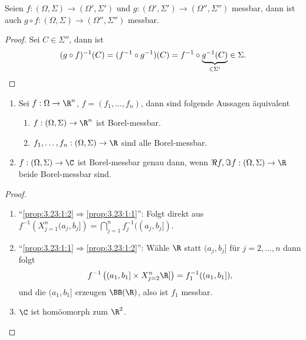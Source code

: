 \begin{prop}
\label{prop:3.22}
Seien $f: (\Omega,\Sigma)\to(\Omega',\Sigma')$ und $g: (\Omega',\Sigma')\to
(\Omega'',\Sigma'')$ messbar, dann ist auch $g\circ f:
(\Omega,\Sigma)\to(\Omega'',\Sigma'')$ messbar.\fishhere
\end{prop}
\begin{proof}
Sei $C\in\Sigma''$, dann ist
\begin{align*}
(g\circ f)^{-1}(C) = (f^{-1}\circ g^{-1})(C) = f^{-1}\circ
\underbrace{g^{-1}(C)}_{\in\Sigma'}\in\Sigma.\qedhere
\end{align*}
\end{proof}

\begin{prop}
\label{prop:3.23}
\begin{enumerate}[label=\arabic{*}.)]
  \item Sei $f:\Omega\to\R^n$, $f=(f_1,\ldots,f_n)$, dann
  sind folgende Aussagen äquivalent \begin{enumerate}[label=(\roman{*})]
    \item\label{prop:3.23:1:1} $f:(\Omega,\Sigma)\to\R^n$ ist Borel-messbar.
    \item\label{prop:3.23:1:2} $f_1,\ldots,f_n: (\Omega,\Sigma)\to\R$ sind alle
    Borel-messbar.
\end{enumerate}
\item $f:(\Omega,\Sigma)\to\C$ ist Borel-messbar genau dann, wenn $\Re f, \Im f
: (\Omega,\Sigma)\to\R$ beide Borel-messbar sind.\fishhere
\end{enumerate}
\end{prop}
\begin{proof}
\begin{enumerate}[label=\arabic{*}.)]
  \item ``\ref{prop:3.23:1:2}$\Rightarrow$\ref{prop:3.23:1:1}'': Folgt direkt 
 aus $f^{-1}\left(X_{j=1}^n (a_j,b_j]\right) = \bigcap_{j=1}^n
  f_j^{-1}((a_j,b_j])$.
  \item ``\ref{prop:3.23:1:1}$\Rightarrow$\ref{prop:3.23:1:2}'': Wähle $\R$
  statt $(a_j,b_j]$ für $j=2,\ldots,n$ dann folgt
  \begin{align*}
  f^{-1}\left((a_1,b_1]\times X_{j=2}^n \R] \right)= f_1^{-1}((a_1,b_1]),
  \end{align*}
und die $(a_1,b_1]$ erzeugen $\BB(\R)$, also ist $f_1$ messbar.
\item $\C$ ist homöomorph zum $\R^2$.\qedhere
\end{enumerate}
\end{proof}

